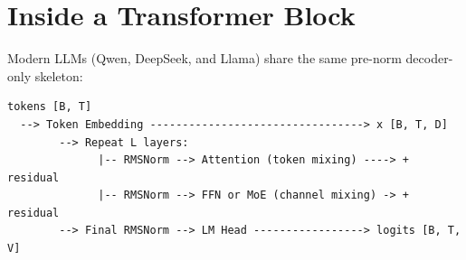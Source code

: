 \section{Inside a Transformer Block}

\noindent\begin{minipage}{\linewidth}
Modern LLMs (Qwen, DeepSeek, and Llama) share the same pre-norm decoder-only skeleton:
\begin{lstlisting}
tokens [B, T]
  --> Token Embedding ---------------------------------> x [B, T, D]
        --> Repeat L layers:
              |-- RMSNorm --> Attention (token mixing) ----> + residual
              |-- RMSNorm --> FFN or MoE (channel mixing) -> + residual
        --> Final RMSNorm --> LM Head -----------------> logits [B, T, V]
\end{lstlisting}
\end{minipage}

